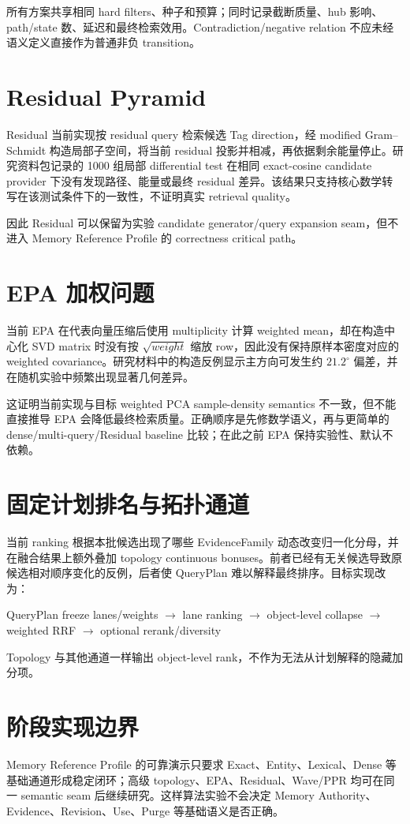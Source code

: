 所有方案共享相同 hard filters、种子和预算；同时记录截断质量、hub 影响、path/state 数、延迟和最终检索效用。Contradiction/negative relation 不应未经语义定义直接作为普通非负 transition。

\section{Residual Pyramid}

Residual 当前实现按 residual query 检索候选 Tag direction，经 modified Gram--Schmidt 构造局部子空间，将当前 residual 投影并相减，再依据剩余能量停止。研究资料包记录的 1000 组局部 differential test 在相同 exact-cosine candidate provider 下没有发现路径、能量或最终 residual 差异。该结果只支持核心数学转写在该测试条件下的一致性，不证明真实 retrieval quality。\cite{nous-research-package,nous-code-snapshot}

因此 Residual 可以保留为实验 candidate generator/query expansion seam，但不进入 Memory Reference Profile 的 correctness critical path。

\section{EPA 加权问题}

当前 EPA 在代表向量压缩后使用 multiplicity 计算 weighted mean，却在构造中心化 SVD matrix 时没有按 $\sqrt{weight}$ 缩放 row，因此没有保持原样本密度对应的 weighted covariance。研究材料中的构造反例显示主方向可发生约 $21.2^\circ$ 偏差，并在随机实验中频繁出现显著几何差异。\cite{nous-research-package,nous-code-snapshot}

这证明当前实现与目标 weighted PCA sample-density semantics 不一致，但不能直接推导 EPA 会降低最终检索质量。正确顺序是先修数学语义，再与更简单的 dense/multi-query/Residual baseline 比较；在此之前 EPA 保持实验性、默认不依赖。

\section{固定计划排名与拓扑通道}

当前 ranking 根据本批候选出现了哪些 EvidenceFamily 动态改变归一化分母，并在融合结果上额外叠加 topology continuous bonuses。前者已经有无关候选导致原候选相对顺序变化的反例，后者使 QueryPlan 难以解释最终排序。目标实现改为：

\begin{center}
QueryPlan freeze lanes/weights $\rightarrow$ lane ranking $\rightarrow$ object-level collapse $\rightarrow$ weighted RRF $\rightarrow$ optional rerank/diversity
\end{center}

Topology 与其他通道一样输出 object-level rank，不作为无法从计划解释的隐藏加分项。\cite{nous-research-package,nous-code-snapshot}

\section{阶段实现边界}

Memory Reference Profile 的可靠演示只要求 Exact、Entity、Lexical、Dense 等基础通道形成稳定闭环；高级 topology、EPA、Residual、Wave/PPR 均可在同一 semantic seam 后继续研究。这样算法实验不会决定 Memory Authority、Evidence、Revision、Use、Purge 等基础语义是否正确。
